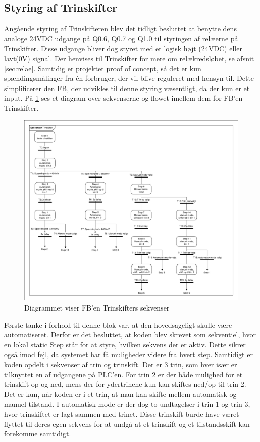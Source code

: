 \subsection{Styring af Trinskifter}

Angående styring af Trinskifteren blev det tidligt besluttet at benytte dens analoge 24VDC udgange på Q0.6, Q0.7 og Q1.0 til styringen af relæerne på Trinskifter. Disse udgange bliver dog styret med et logisk højt (24VDC) eller lavt(0V) signal. Der henvises til Trinskifter for mere om relækredsløbet, se afsnit \ref{sec:relae}.
Samtidig er projektet proof of concept, så det er kun spændingsmålinger fra én forbruger, der vil blive reguleret med hensyn til. Dette simplificerer den FB, der udvikles til denne styring væsentligt, da der kun er et input. På \ref{fig:GraphTrinskifterPLC} ses et diagram over sekvenserne og flowet imellem dem for FB'en Trinskifter.

\begin{figure}[H] %
	\centering
	\includegraphics[width=1\textwidth]{Figure/GraphTrinskifterPLC}
	\caption{Diagrammet viser FB'en Trinskifters sekvenser}
	\label{fig:GraphTrinskifterPLC}
\end{figure}

Første tanke i forhold til denne blok var, at den hovedsageligt skulle være automatiseret. Derfor er det besluttet, at koden blev skrevet som sekventiel, hvor en lokal static Step står for at styre, hvilken sekvens der er aktiv. Dette sikrer også imod fejl, da systemet har få muligheder videre fra hvert step. Samtidigt er koden opdelt i sekvenser af trin og trinskift. Der er 3 trin, som hver især er tilknyttet en af udgangene på PLC'en. For trin 2 er der både mulighed for et trinskift op og ned, mens der for ydertrinene kun kan skiftes ned/op til trin 2. Det er kun, når koden er i et trin, at man kan skifte mellem automatisk og manuel tilstand. I automatisk mode er der dog to undtagelser i trin 1 og trin 3, hvor trinskiftet er lagt sammen med trinet. Disse trinskift burde have været flyttet til deres egen sekvens for at undgå at et trinskift og et tilstandsskift kan forekomme samtidigt.


